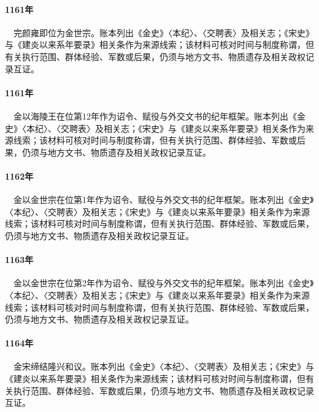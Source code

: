 \paragraph{1161年}　完颜雍即位为金世宗。账本列出《金史》〈本纪〉、〈交聘表〉及相关志；《宋史》与《建炎以来系年要录》相关条作为来源线索；该材料可核对时间与制度称谓，但有关执行范围、群体经验、军数或后果，仍须与地方文书、物质遗存及相关政权记录互证。

\paragraph{1161年}　金以海陵王在位第12年作为诏令、赋役与外交文书的纪年框架。账本列出《金史》〈本纪〉、〈交聘表〉及相关志；《宋史》与《建炎以来系年要录》相关条作为来源线索；该材料可核对时间与制度称谓，但有关执行范围、群体经验、军数或后果，仍须与地方文书、物质遗存及相关政权记录互证。

\paragraph{1162年}　金以金世宗在位第1年作为诏令、赋役与外交文书的纪年框架。账本列出《金史》〈本纪〉、〈交聘表〉及相关志；《宋史》与《建炎以来系年要录》相关条作为来源线索；该材料可核对时间与制度称谓，但有关执行范围、群体经验、军数或后果，仍须与地方文书、物质遗存及相关政权记录互证。

\paragraph{1163年}　金以金世宗在位第2年作为诏令、赋役与外交文书的纪年框架。账本列出《金史》〈本纪〉、〈交聘表〉及相关志；《宋史》与《建炎以来系年要录》相关条作为来源线索；该材料可核对时间与制度称谓，但有关执行范围、群体经验、军数或后果，仍须与地方文书、物质遗存及相关政权记录互证。

\paragraph{1164年}　金宋缔结隆兴和议。账本列出《金史》〈本纪〉、〈交聘表〉及相关志；《宋史》与《建炎以来系年要录》相关条作为来源线索；该材料可核对时间与制度称谓，但有关执行范围、群体经验、军数或后果，仍须与地方文书、物质遗存及相关政权记录互证。

